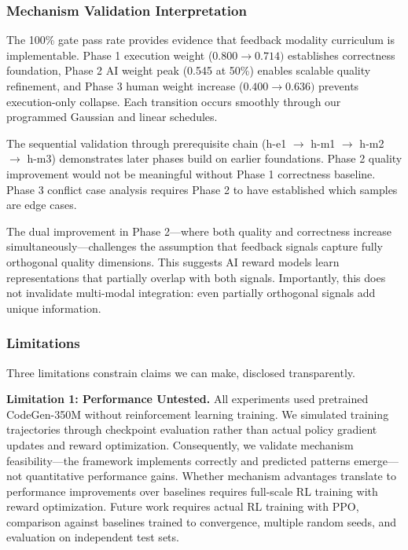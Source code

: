 
\subsubsection{Mechanism Validation Interpretation}

The 100\% gate pass rate provides evidence that feedback modality curriculum is implementable. Phase 1 execution weight (0.$800\rightarrow 0.714)$ establishes correctness foundation, Phase 2 AI weight peak (0.545 at 50\%) enables scalable quality refinement, and Phase 3 human weight increase (0.$400\rightarrow 0.636)$ prevents execution-only collapse. Each transition occurs smoothly through our programmed Gaussian and linear schedules.

The sequential validation through prerequisite chain (h-e1 $\rightarrow$ h-m1 $\rightarrow$ h-m2 $\rightarrow$ h-m3) demonstrates later phases build on earlier foundations. Phase 2 quality improvement would not be meaningful without Phase 1 correctness baseline. Phase 3 conflict case analysis requires Phase 2 to have established which samples are edge cases.

The dual improvement in Phase 2---where both quality and correctness increase simultaneously---challenges the assumption that feedback signals capture fully orthogonal quality dimensions. This suggests AI reward models learn representations that partially overlap with both signals. Importantly, this does not invalidate multi-modal integration: even partially orthogonal signals add unique information.

\subsubsection{Limitations}

Three limitations constrain claims we can make, disclosed transparently.

\textbf{Limitation 1: Performance Untested.} All experiments used pretrained CodeGen-350M without reinforcement learning training. We simulated training trajectories through checkpoint evaluation rather than actual policy gradient updates and reward optimization. Consequently, we validate mechanism feasibility---the framework implements correctly and predicted patterns emerge---not quantitative performance gains. Whether mechanism advantages translate to performance improvements over baselines requires full-scale RL training with reward optimization. Future work requires actual RL training with PPO, comparison against baselines trained to convergence, multiple random seeds, and evaluation on independent test sets.

